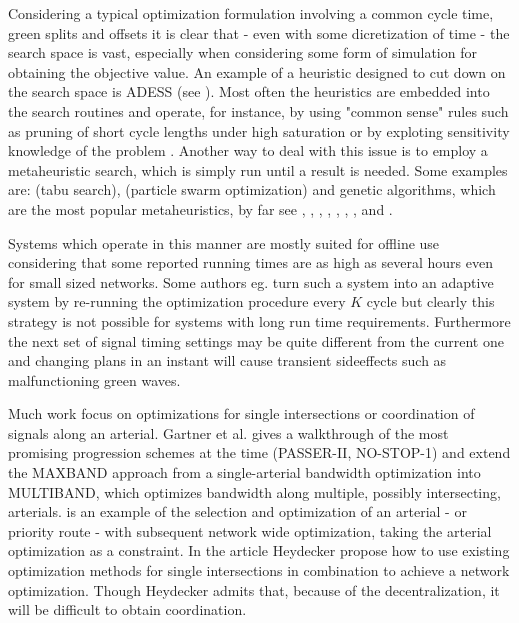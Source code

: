 Considering a typical optimization formulation involving a common
cycle time, green splits and offsets it is clear that - even with some
dicretization of time - the search space is vast, especially when
considering some form of simulation for obtaining the objective
value. An example of a heuristic designed to cut down on the search
space is ADESS (see \cite{26}). Most often the heuristics are embedded
into the search routines and operate, for instance, by using "common
sense" rules such as pruning of short cycle lengths under high
saturation or by exploting sensitivity knowledge of the problem
\cite{40}.  Another way to deal with this issue is to employ a
metaheuristic search, which is simply run until a result is
needed. Some examples are: \cite{1} (tabu search), \cite{42} (particle
swarm optimization) and genetic algorithms, which are the most popular
metaheuristics, by far see \cite{13}, \cite{33}, \cite{43}, \cite{7},
\cite{41}, \cite{31}, \cite{27}, \cite{2} and \cite{26}.

Systems which operate in this manner are mostly suited for offline use considering that some reported running times are as high as several hours even for small sized networks.
Some authors eg. \cite{16} turn such a system into an adaptive system by re-running the optimization procedure every $K$ cycle but clearly this strategy is not possible for systems with long run time requirements. Furthermore the next set of signal timing settings may be quite different from the current one and changing plans in an instant will cause transient sideeffects such as malfunctioning green waves.

Much work focus on optimizations for single intersections or
coordination of signals along an arterial. Gartner et al. \cite{9}
gives a walkthrough of the most promising progression schemes at the
time (PASSER-II, NO-STOP-1) and extend the MAXBAND approach from a
single-arterial bandwidth optimization into MULTIBAND, which optimizes
bandwidth along multiple, possibly intersecting, arterials. \cite{6}
is an example of the selection and optimization of an arterial - or
priority route - with subsequent network wide optimization, taking the
arterial optimization as a constraint.  In the article \cite{24}
Heydecker propose how to use existing optimization methods for single
intersections in combination to achieve a network optimization. Though
Heydecker admits that, because of the decentralization, it will be
difficult to obtain coordination.
